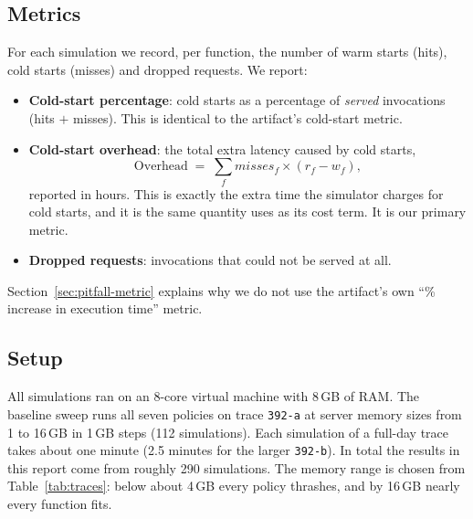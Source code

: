 \documentclass[11pt,a4paper]{article}
\newcommand{\gd}{\text{GD}}
\newcommand{\code}[1]{\texttt{#1}}
\begin{document}
\subsection{Metrics}
For each simulation we record, per function, the number of warm starts (hits), cold starts
(misses) and dropped requests. We report:
\begin{itemize}
  \item \textbf{Cold-start percentage}: cold starts as a percentage of \emph{served}
        invocations (hits $+$ misses). This is identical to the artifact's cold-start metric.
  \item \textbf{Cold-start overhead}: the total extra latency caused by cold starts,
        \begin{equation}
          \label{eq:overhead}
          \mathrm{Overhead} \;=\; \sum_f \mathit{misses}_f \times (r_f - w_f),
        \end{equation}
        reported in hours. This is exactly the extra time the simulator charges for cold starts,
        and it is the same quantity \gd{} uses as its cost term. It is our primary metric.
  \item \textbf{Dropped requests}: invocations that could not be served at all.
\end{itemize}
Section~\ref{sec:pitfall-metric} explains why we do not use the artifact's own
``\% increase in execution time'' metric.

\subsection{Setup}
All simulations ran on an 8-core virtual machine with 8\,GB of RAM. The baseline sweep runs
all seven policies on trace \code{392-a} at server memory sizes from 1 to 16\,GB in 1\,GB steps
(112 simulations). Each simulation of a full-day trace takes about one minute (2.5 minutes for
the larger \code{392-b}). In total the results in this report come from roughly 290
simulations. The memory range is chosen from Table~\ref{tab:traces}: below about 4\,GB every
policy thrashes, and by 16\,GB nearly every function fits.
\end{document}

